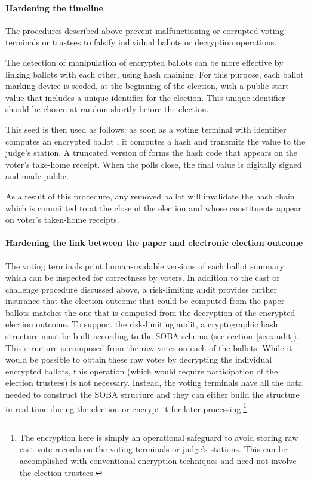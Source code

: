 \documentclass[letterpaper, 10pt, twocolumn]{article}
\begin{document}
\paragraph{Hardening the timeline}
\label{sec:hard-timeline}

The procedures described above prevent malfunctioning or corrupted
voting terminals or trustees to falsify individual ballots or decryption
operations.

The detection of manipulation of encrypted ballots can be more
effective by linking ballots with each other, using hash chaining.
For this purpose, each ballot marking device is seeded, at the beginning
of the election, with a public start value  that includes a
unique identifier for the election.
This unique identifier should be chosen at random shortly before the
election.



This  seed is then used as follows: as soon as a voting terminal
with identifier  computes an encrypted ballot , it
computes a hash  and transmits the value
to the judge's station. A truncated version of  forms the hash code
that appears on the voter's take-home receipt.  When the polls close,
the final  value is digitally signed and made public.

As a result of this procedure, any removed ballot will
invalidate the hash chain which is committed to at the close of the
election and whose constituents appear on voter's taken-home receipts.

\paragraph{Hardening the link between the paper and electronic
  election outcome}
\label{sec:hard-link-betw}

The voting terminals print human-readable versions of each
ballot summary which can be inspected for correctness by voters.
In addition to the cast or challenge procedure discussed above,
a risk-limiting audit provides further insurance that the
election outcome that could be computed from the paper ballots matches
the one that is computed from the decryption of the encrypted election
outcome.
To support the risk-limiting audit, a cryptographic hash structure
must be built according to the SOBA schema (see section~\ref{sec:audit}).
This structure is composed from the raw votes on each of the ballots.
While it would be possible to obtain these raw votes by decrypting the
individual encrypted ballots, this operation (which would require participation
of the election trustees) is not necessary.  Instead, the voting terminals
have all the data needed to construct the SOBA structure and they can either
build the structure in real time during the election or encrypt it for
later processing.\footnote{
The encryption here is simply an operational safeguard to avoid storing raw
cast vote records on the voting terminals or judge's stations.
This can be accomplished with conventional encryption techniques and need
not involve the election trustees.}
\end{document}
